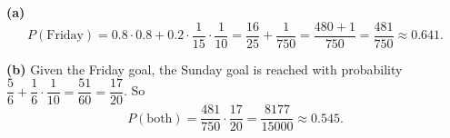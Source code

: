 \textbf{(a)} \[P(\text{Friday})=0.8\cdot0.8+0.2\cdot\dfrac1{15}\cdot\dfrac1{10}=\dfrac{16}{25}+\dfrac1{750}=\dfrac{480+1}{750}=\boxed{\dfrac{481}{750}}\approx0.641.\]

\textbf{(b)} Given the Friday goal, the Sunday goal is reached with probability $\dfrac56+\dfrac16\cdot\dfrac1{10}=\dfrac{51}{60}=\dfrac{17}{20}$. So
\[P(\text{both})=\dfrac{481}{750}\cdot\dfrac{17}{20}=\boxed{\dfrac{8177}{15000}}\approx0.545.\]
